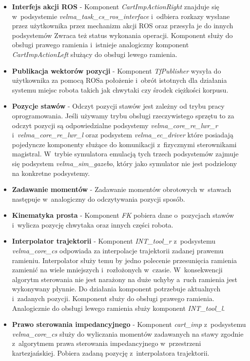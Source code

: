 \begin{itemize}
	\item \textbf{Interfejs akcji ROS} - 
	Komponent \textit{CartImpActionRight} znajduje się w~podsystemie \textit{velma\_task\_cs\_ros\_interface} i~odbiera rozkazy wysłane przez użytkownika przez mechanizm akcji ROS oraz przesyła je do innych podsystemów Zwraca też status wykonania operacji. Komponent służy do obsługi prawego ramienia i~istnieje analogiczny komponent \textit{CartImpActionLeft} służący do obsługi lewego ramienia.
	\item \textbf{Publikacja wektorów pozycji} - 
	Komponent \textit{TfPublisher} wysyła do użytkownika za pomocą ROSa położenie i~obrót istotnych dla działania systemu miejsc robota takich jak chwytaki czy środek ciężkości korpusu. 
	\item \textbf{Pozycje stawów} - 
	Odczyt pozycji stawów jest zależny od trybu pracy oprogramowania. Jeśli używamy trybu obsługi rzeczywistego sprzętu to za odczyt pozycji są odpowiedzialne podsystemy \textit{velma\_core\_re\_lwr\_r} i~\textit{velma\_core\_re\_lwr\_l} oraz podsystem \textit{velma\_ec\_driver} które posiadają pojedyncze komponenty służące do komunikacji z~fizycznymi sterownikami magistral. W~trybie symulatora emulacją tych trzech podsystemów zajmuje się podsystem \textit{velma\_sim\_gazebo}, który jako symulator nie jest podzielony na konkretne podsystemy.
	\item \textbf{Zadawanie momentów} - 
	Zadawanie momentów obrotowych w~stawach następuje w~analogiczny do odczytywania pozycji sposób.
	\item \textbf{Kinematyka prosta} - 
	Komponent \textit{FK} pobiera dane o~pozycjach stawów i~wylicza pozycję chwytaka oraz innych części robota.
	\item \textbf{Interpolator trajektorii} - 
	Komponent \textit{INT\_tool\_r} z~podsystemu \textit{velma\_core\_cs} odpowiada za interpolacje trajektorii zadanej prawemu ramieniu. Interpolator służy temu by jedno polecenie przesunięcia ramienia zamienić na wiele mniejszych i~rozłożonych w~czasie. W~konsekwencji algorytm sterowania nie jest narażony na duże uchyby a~ruch ramienia jest wykonywany płynnie. Do działania komponent potrzebuje aktualnych i~zadanych pozycji. Komponent służy do obsługi prawego ramienia. Analogicznie do obsługi lewego ramienia służy komponent \textit{INT\_tool\_l}.
	
	\item \textbf{Prawo sterowania impedancyjnego} - 
	Komponent \textit{cart\_imp} z~podsystemu \textit{velma\_core\_cs} służy do wyliczania momentów zadawanych na stawy zgodnie z~algorytmem prawa sterowania impedancyjnego w~przestrzeni kartezjańskiej. Pobiera zadaną pozycję z~interpolatora trajektorii.
\end{itemize}

